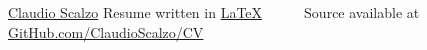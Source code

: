 \documentclass[11pt, a4paper]{awesome-cv}
\begin{document}
\makecvheader[L]

\makecvfooter
  {\href{https://www.linkedin.com/in/claudioscalzo}{Claudio Scalzo}}
  {}
  {Resume written in \href{https://www.latex-project.org}{\LaTeX}~~~\textbullet~~~Source available at \href{https://github.com/claudioscalzo/cv}{GitHub.com/ClaudioScalzo/CV}}








\end{document}
